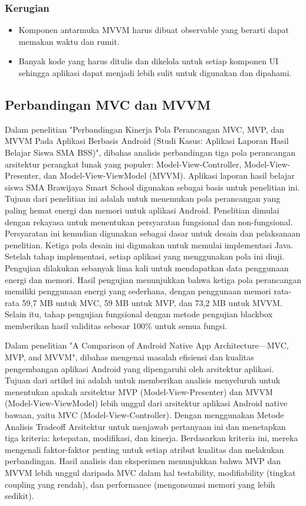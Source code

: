 \documentclass[conference]{IEEEtran}
\begin{document}
	\subsubsection{Kerugian}
	\begin{itemize}
		\item Komponen antarmuka MVVM harus dibuat observable yang berarti dapat memakan waktu dan rumit.
		\item Banyak kode yang harus ditulis dan dikelola untuk setiap komponen UI sehingga aplikasi dapat menjadi lebih sulit untuk digunakan dan dipahami.
	\end{itemize}
	
	\subsection{Perbandingan MVC dan MVVM}
	Dalam penelitian "Perbandingan Kinerja Pola Perancangan MVC, MVP, dan MVVM Pada Aplikasi Berbasis Android (Studi Kasus: Aplikasi Laporan Hasil Belajar Siswa SMA BSS)"\cite{Perbandingan1}, dibahas analisis perbandingan tiga pola perancangan arsitektur perangkat lunak yang populer: Model-View-Controller, Model-View-Presenter, dan Model-View-ViewModel (MVVM).  Aplikasi laporan hasil belajar siswa SMA Brawijaya Smart School digunakan sebagai basis untuk penelitian ini. Tujuan dari penelitian ini adalah untuk menemukan pola perancangan yang paling hemat energi dan memori untuk aplikasi Android. Penelitian dimulai dengan rekayasa untuk menentukan persyaratan fungsional dan non-fungsional. Persyaratan ini kemudian digunakan sebagai dasar untuk desain dan pelaksanaan penelitian. Ketiga pola desain ini digunakan untuk memulai implementasi Java. Setelah tahap implementasi, setiap aplikasi yang menggunakan pola ini diuji. Pengujian dilakukan sebanyak lima kali untuk mendapatkan data penggunaan energi dan memori. Hasil pengujian menunjukkan bahwa ketiga pola perancangan memiliki penggunaan energi yang sederhana, dengan penggunaan memori rata-rata 59,7 MB untuk MVC, 59 MB untuk MVP, dan 73,2 MB untuk MVVM. Selain itu, tahap pengujian fungsional dengan metode pengujian blackbox memberikan hasil validitas sebesar 100\% untuk semua fungsi.
	
	Dalam penelitian "A Comparison of Android Native App Architecture—MVC, MVP, and MVVM"\cite{Perbandingan2}, dibahas mengenai masalah efisiensi dan kualitas pengembangan aplikasi Android yang dipengaruhi oleh arsitektur aplikasi. Tujuan dari artikel ini adalah untuk memberikan analisis menyeluruh untuk menentukan apakah arsitektur MVP (Model-View-Presenter) dan MVVM (Model-View-ViewModel) lebih unggul dari arsitektur aplikasi Android native bawaan, yaitu MVC (Model-View-Controller). Dengan menggunakan Metode Analisis Tradeoff Arsitektur untuk menjawab pertanyaan ini dan menetapkan tiga kriteria: ketepatan, modifikasi, dan kinerja. Berdasarkan kriteria ini, mereka mengenali faktor-faktor penting untuk setiap atribut kualitas dan melakukan perbandingan. Hasil analisis dan eksperimen menunjukkan bahwa MVP dan MVVM lebih unggul daripada MVC dalam hal testability, modifiability (tingkat coupling yang rendah), dan performance (mengonsumsi memori yang lebih sedikit).
	
\end{document}
